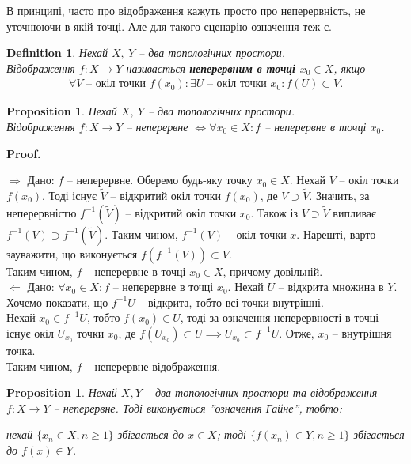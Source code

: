 \documentclass[a4paper, 10pt]{article}
\makeatletter
\def\rightproof{$\boxed{\Rightarrow}$ }
\def\leftproof{$\boxed{\Leftarrow}$ }
\theoremstyle{theoremdd}
\newtheorem{definition}[theorem]{Definition}
\newtheorem{proposition}[theorem]{Proposition}
\renewenvironment{proof}[1][Proof.\\]{\par
\pushQED{\hfill \qed}%
\normalfont \topsep6\p@\@plus6\p@\relax
\trivlist
\item\relax
{\bfseries
#1\@addpunct{.}}\hspace\labelsep\ignorespaces
}{%
\popQED\endtrivlist\@endpefalse
}
\makeatother
\begin{document}
\noindent В принципі, часто про відображення кажуть просто про неперервність, не уточнюючи в якій точці. Але для такого сценарію означення теж є.

\begin{definition}
Нехай $X,\ Y$ -- два топологічних простори.\\
Відображення $f \colon X \to Y$ називається \textbf{неперервним в точці $x_0 \in X$}, якщо
\begin{align*}
\forall V \text{ -- окіл точки } f(x_0) : \exists U \text{ -- окіл точки } x_0 : f(U) \subset V.
\end{align*}
\end{definition}

\begin{proposition}
Нехай $X,\ Y$ -- два топологічних простори.\\
Відображення $f \colon X \to Y$ -- неперервне $\iff \forall x_0 \in X: f $ -- неперервне в точці $x_0$.
\end{proposition}

\begin{proof}
\rightproof Дано: $f$ -- неперервне. Оберемо будь-яку точку $x_0 \in X$. Нехай $V$ -- окіл точки $f(x_0)$. Тоді існує $\tilde{V}$ -- відкритий окіл точки $f(x_0)$, де $V \supset \tilde{V}$. Значить, за неперервністю $f^{-1}(\tilde{V})$ -- відкритий окіл точки $x_0$. Також із $V \supset \tilde{V}$ випливає $f^{-1}(V) \supset f^{-1}(\tilde{V})$. Таким чином, $f^{-1}(V)$ -- окіл точки $x$. Нарешті, варто зауважити, що виконується $f(f^{-1}(V)) \subset V$.\\
Таким чином, $f$ -- неперервне в точці $x_0 \in X$, причому довільній.
\bigskip \\
\leftproof Дано: $\forall x_0 \in X: f $ -- неперервне в точці $x_0$. Нехай $U$ -- відкрита множина в $Y$. Хочемо показати, що $f^{-1}U$ -- відкрита, тобто всі точки внутрішні.\\
Нехай $x_0 \in f^{-1}U$, тобто $f(x_0) \in U$, тоді за означення неперервності в точці існує окіл $U_{x_0}$ точки $x_0$, де $f(U_{x_0}) \subset U \implies U_{x_0} \subset f^{-1}U$. Отже, $x_0$ -- внутрішня точка.\\
Таким чином, $f$ -- неперервне відображення.
\end{proof}

\begin{proposition}
Нехай $X,Y$ -- два топологічних простори та відображення $f \colon X \to Y$ -- неперервне. Тоді виконується ''означення Гайне'', тобто:
\begin{center}
нехай $\{x_n \in X, n \geq 1\}$ збігається до $x \in X$; тоді $\{f(x_n) \in Y, n \geq 1\}$ збігається до $f(x) \in Y$.
\end{center}
\end{proposition}
\end{document}
